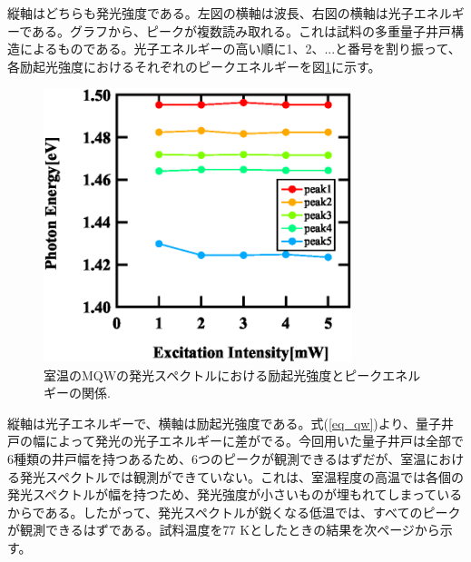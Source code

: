 \documentclass[11pt,a4j]{jsarticle}
\begin{document}
\begin{enumerate}
\begin{figure}[ht]
       \end{figure}


       縦軸はどちらも発光強度である。左図の横軸は波長、右図の横軸は光子エネルギーである。グラフから、ピークが複数読み取れる。これは試料の多重量子井戸構造によるものである。光子エネルギーの高い順に1、2、...と番号を割り振って、各励起光強度におけるそれぞれのピークエネルギーを図\ref{fig_mqw_rt_peak1}に示す。

       \begin{figure}[ht]
        \centering
        \includegraphics[clip,width=9cm]{start2_MQW_rt_Peak.eps}
        \caption{室温のMQWの発光スペクトルにおける励起光強度とピークエネルギーの関係.}
        \label{fig_mqw_rt_peak1}
       \end{figure}




       \newpage

       縦軸は光子エネルギーで、横軸は励起光強度である。式(\ref{eq_qw})より、量子井戸の幅によって発光の光子エネルギーに差がでる。今回用いた量子井戸は全部で6種類の井戸幅を持つあるため、6つのピークが観測できるはずだが、室温における発光スペクトルでは観測ができていない。これは、室温程度の高温では各個の発光スペクトルが幅を持つため、発光強度が小さいものが埋もれてしまっているからである。したがって、発光スペクトルが鋭くなる低温では、すべてのピークが観測できるはずである。試料温度を77 Kとしたときの結果を次ページから示す。


\end{enumerate}
\end{document}
